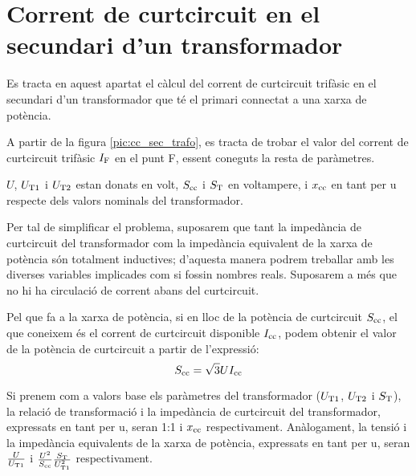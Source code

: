 \section{Corrent de curtcircuit en el  secundari d'un transformador}
\label{sec:cc-sec-trafo}

 Es tracta en aquest apartat el càlcul del corrent de curtcircuit trifàsic en el secundari d'un transformador que té el
primari connectat  a una xarxa de potència.

A partir de la figura \vref{pic:cc_sec_trafo}, es tracta de trobar
el valor del corrent de curtcircuit trifàsic $I_\mathrm{F}$ en el punt
F, essent coneguts la resta de paràmetres.

\begin{center}
    
     \label{pic:cc_sec_trafo}
\end{center}

$U$, $U_\mathrm{T1}$ i $U_\mathrm{T2}$ estan donats en volt,
$S_\mathrm{cc}$ i $S_\mathrm{T}$ en voltampere, i $x_\mathrm{cc}$ en tant per u
respecte dels valors nominals del transformador.


Per tal de simplificar el problema, suposarem que tant la impedància
de curtcircuit del transformador com la impedància equivalent de
la xarxa de potència són totalment inductives; d'aquesta manera
podrem treballar amb les diverses variables implicades com si
fossin nombres reals. Suposarem a més que no hi ha circulació de
corrent abans del curtcircuit.

Pel que fa a la xarxa de potència, si en lloc de la potència de curtcircuit $S_\mathrm{cc}$, el que coneixem és el corrent de curtcircuit
disponible $I_\mathrm{cc}$, podem obtenir el valor de la potència de
curtcircuit a partir de l'expressió:
\begin{equation}
    S_\mathrm{cc} = \sqrt{3} U I_\mathrm{cc}
\end{equation}

 Si prenem com a valors base els
paràmetres del transformador ($U_\mathrm{T1}$, $U_\mathrm{T2}$ i
$S_\mathrm{T}$), la relació de transformació i la impedància de curtcircuit del transformador, expressats en tant per u, seran 1:1 i
$x_\mathrm{cc}$ respectivament. Anàlogament, la tensió i la impedància
equivalents de la xarxa de potència, expressats en tant per u, seran
$\frac{U}{U_\mathrm{T1}}$ i $\frac{U^2}{S_\mathrm{cc}}
\frac{S_\mathrm{T}}{U_\mathrm{T1}^2}$ respectivament.

